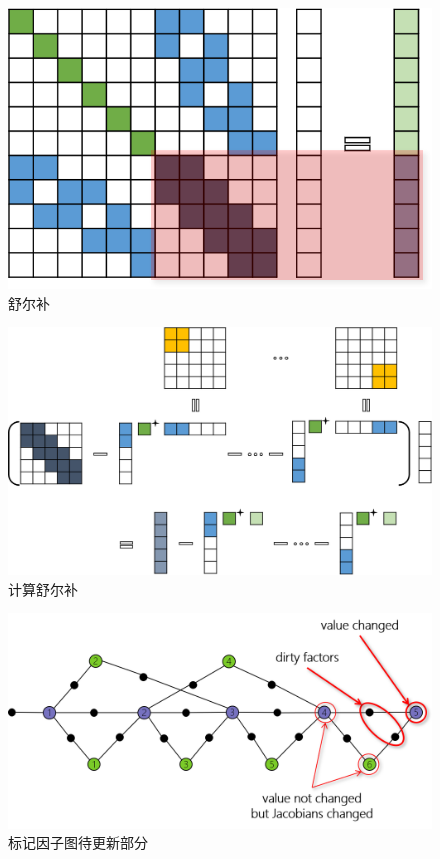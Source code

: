 \begin{figure}[htb!]
    \centering
    \includegraphics{figs/reduced_sys.png}
    \caption{舒尔补}
\end{figure}

\begin{figure}[htb!]
    \centering
    \includegraphics[width=\textwidth]{figs/schur_complement.png}
    \caption{计算舒尔补}
\end{figure}

\begin{figure}[htb!]
    \centering
    \includegraphics[width=.8\textwidth]{figs/factor_graph_dirty.png}
    \caption{标记因子图待更新部分}
\end{figure}

